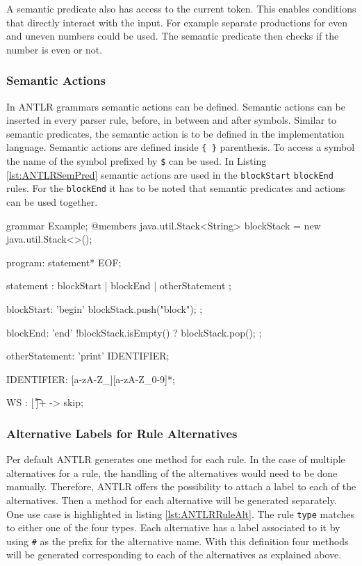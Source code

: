 A semantic predicate also has access to the current token. This enables conditions that directly interact with the input. For example separate productions for even and uneven numbers could be used. The semantic predicate then checks if the number is even or not.  


\subsubsection{Semantic Actions}

In ANTLR grammars semantic actions can be defined. Semantic actions can be inserted in every parser rule, before, in between and after symbols. Similar to semantic predicates, the semantic action is to be defined in the implementation language. Semantic actions are defined inside \verb|{ }| parenthesis. To access a symbol the name of the symbol prefixed by \verb|$| can be used. In Listing \ref{lst:ANTLRSemPred} semantic actions are used in the \texttt{blockStart} \texttt{blockEnd} rules. For the \texttt{blockEnd} it has to be noted that semantic predicates and actions can be used together. 


\begin{AntlrCode}[float,numbers=none,caption=Example grammar using a semantic predicate and a semantic action., label=lst:ANTLRSemPred]
grammar Example;
@members {
    java.util.Stack<String> blockStack = new java.util.Stack<>();
}

program: statement* EOF;

statement
    : blockStart
    | blockEnd
    | otherStatement
    ;

blockStart: 'begin' { blockStack.push("block"); };

blockEnd: 'end' { !blockStack.isEmpty() }? { blockStack.pop(); };

otherStatement: 'print' IDENTIFIER;

IDENTIFIER: [a-zA-Z_][a-zA-Z_0-9]*;

WS  : [ \t\r\n]+ -> skip;
\end{AntlrCode}


\subsubsection{Alternative Labels for Rule Alternatives}

Per default ANTLR generates one method for each rule. In the case of multiple alternatives for a rule, the handling of the alternatives would need to be done manually. Therefore, ANTLR offers the possibility to attach a label to each of the alternatives. Then a method for each alternative will be generated separately. One use case is highlighted in listing \ref{lst:ANTLRRuleAlt}. The rule \texttt{type} matches to either one of the four types. Each alternative has a label associated to it by using \verb|#| as the prefix for the alternative name. With this definition four methods will be generated corresponding to each of the alternatives as explained above.     

